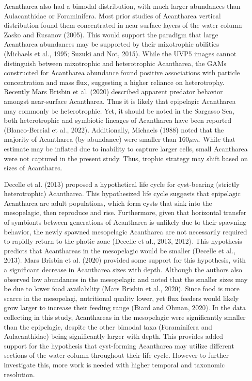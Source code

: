 \documentclass[
]{article}
\begin{document}
Acantharea also had a bimodal distribution, with much larger abundances
than Aulacanthidae or Foraminifera. Most prior studies of Acantharea
vertical distribution found them concentrated in near surface layers of
the water column Zasko and Rusanov (2005). This would support the
paradigm that large Acantharea abundances may be supported by their
mixotrophic abilities (Michaels et al., 1995; Suzuki and Not, 2015).
While the UVP5 images cannot distinguish between mixotrophic and
heterotrophic Acantharea, the GAMs constructed for Acantharea abundance
found positive associations with particle concentration and mass flux,
suggesting a higher reliance on heterotrophy. Recently Mars Brisbin et
al. (2020) described apparent predator behavior amongst near-surface
Acantharea. Thus it is likely that epipelagic Acantharea may commonly be
heterotrophic. Yet, it should be noted in the Sargasso Sea, both
heterotrophic and symbiotic lineages of Acantharea have been reported
(Blanco-Bercial et al., 2022). Additionally, Michaels (1988) noted that
the majority of Acantharea (by abundance) were smaller than
160\(\mu m\). While that estimate may be inflated due to inability to
capture larger cells, small Acantharea were not captured in the present
study. Thus, trophic strategy may shift based on sizes of Acantharea.

Decelle et al. (2013) proposed a hypothetical life cycle for
cyst-bearing (strictly heterotrophic) Acantharea. This hypothesized life
cycle suggests that epipelagic Acantharea are adult populations, which
form cysts that sink into the mesopelagic, then reproduce and rise.
Furthermore, given that horizontal transfer of symbionts between
generations of Acantharea is unlikely due to their spawning behavior,
the newly spawned mesopelagic Acantharea are not necessarily required to
rapidly return to the photic zone (Decelle et al., 2013, 2012). This
hypothesis predicts that Acanthareas in the mesopelagic would be smaller
(Decelle et al., 2013). Mars Brisbin et al. (2020) provided some support
for this hypothesis, with a significant decrease in Acantharea sizes
with depth. Although the authors also observed low abundances in the
mesopelagic and noted that the smaller sizes may be due to lower food
availability (Mars Brisbin et al., 2020). Since food is more scarce in
the mesopelagi, nutritional quality lower, yet flux feeders would likely
grow larger to increase their feeding range (Biard and Ohman, 2020). In
the data collecting in this study, Acanthareas in the mesopelagic were
significantly smaller than the epipelagic, despite the other bimodal
taxa (Foraminifera and Aulacanthidae) being significantly larger with
depth. This provides added support for the hypothesis that cyst-forming
Acantharea may utilize different sections of the water column throughout
their life cycle. However to further investigate this, more work is
needed with higher temporal and taxonomic resolution.
\end{document}
